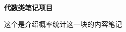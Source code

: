 \newpage
\begin{center}
	\faSendO  \textbf{代数类笔记项目} \faSendO \\
\end{center}

这个是介绍概率统计这一块的内容笔记

\vspace{-5pt}